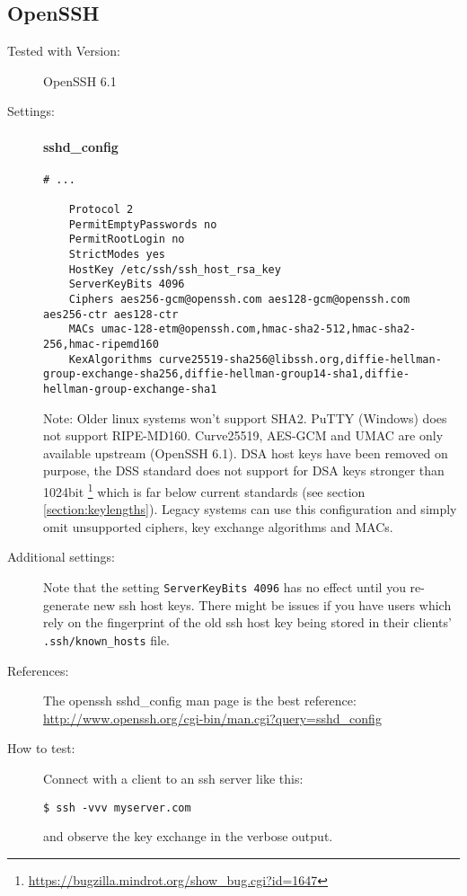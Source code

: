 \subsection{OpenSSH}


\begin{description}
\item[Tested with Version:] OpenSSH 6.1

\item[Settings:] \mbox{}


\paragraph*{sshd_config}
\begin{lstlisting}[breaklines]
	# ...

	Protocol 2
	PermitEmptyPasswords no
	PermitRootLogin no
	StrictModes yes
	HostKey /etc/ssh/ssh_host_rsa_key
	ServerKeyBits 4096
	Ciphers aes256-gcm@openssh.com aes128-gcm@openssh.com aes256-ctr aes128-ctr
	MACs umac-128-etm@openssh.com,hmac-sha2-512,hmac-sha2-256,hmac-ripemd160
	KexAlgorithms curve25519-sha256@libssh.org,diffie-hellman-group-exchange-sha256,diffie-hellman-group14-sha1,diffie-hellman-group-exchange-sha1
\end{lstlisting}


Note: Older linux systems won't support SHA2. PuTTY (Windows) does not support
RIPE-MD160. Curve25519, AES-GCM and UMAC are only available upstream (OpenSSH
6.1). DSA host keys have been removed on purpose, the DSS standard does not
support for DSA keys stronger than 1024bit
\footnote{\url{https://bugzilla.mindrot.org/show_bug.cgi?id=1647}} which is far
below current standards (see section \ref{section:keylengths}). Legacy systems
can use this configuration and simply omit unsupported ciphers, key exchange
algorithms and MACs.  

\item[Additional settings:] \mbox{}

Note that the setting \texttt{ServerKeyBits 4096}  has no effect until you re-generate new ssh host keys. There might be issues if you have users which rely on the fingerprint of the old ssh host key being stored in their clients' \texttt{.ssh/known\_hosts} file.

\item[References:]
The openssh sshd\_config  man page is the best reference: \url{http://www.openssh.org/cgi-bin/man.cgi?query=sshd_config}


\item[How to test:]
Connect with a client to an ssh server like this: \\
\begin{lstlisting}[breaklines]
$ ssh -vvv myserver.com
\end{lstlisting}
and observe the key exchange in the verbose output.

\end{description}

